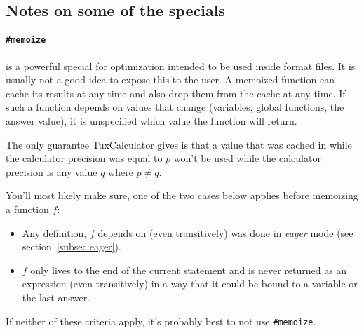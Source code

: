 \documentclass[10pt]{article}
\begin{document}
    \subsection{Notes on some of the specials}\label{subsec:notes-special}
    \paragraph{\texttt{\#memoize}} is a powerful special for optimization intended to be used inside format files.
    It is usually not a good idea to expose this to the user.
    A memoized function can cache its results at any time and also drop them from the cache at any time.
    If such a function depends on values that change (variables, global functions, the answer value), it is unspecified which value the function will return.
    
    The only guarantee TuxCalculator gives is that a value that was cached in while the calculator precision was equal to $ p $ won't be used while the calculator precision is any value $ q $ where $ p \neq q $.
    
    You'll most likely make sure, one of the two cases below applies before memoizing a function $ f $:
    \begin{itemize}
        \item Any definition, $ f $ depends on (even transitively) was done in \textsl{eager} mode (see section~\ref{subsec:eager}).
        \item $ f $ only lives to the end of the current statement and is never returned as an expression (even transitively) in a way that it could be bound to a variable or the last answer.
    \end{itemize}
    If neither of these criteria apply, it's probably best to not use \verb|#memoize|.
\end{document}
